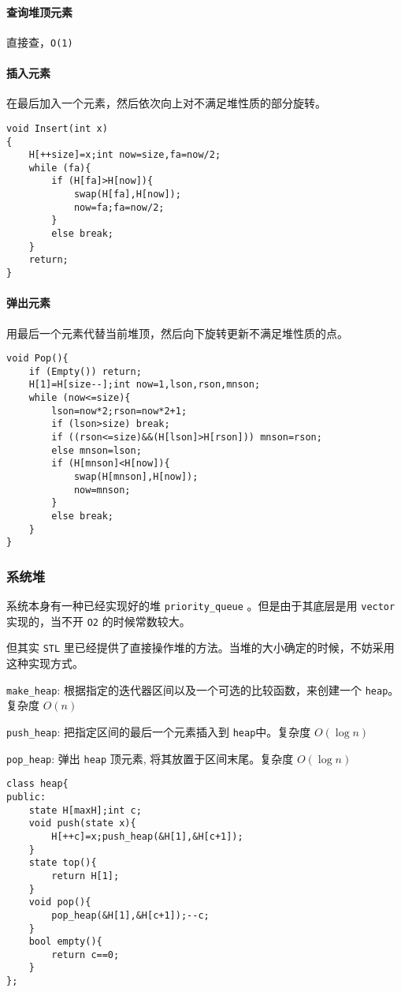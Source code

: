 \documentclass[UTF-8]{ctexart}
\begin{document}
	\paragraph{查询堆顶元素} 直接查，\texttt{O(1)}
	\paragraph{插入元素} 在最后加入一个元素，然后依次向上对不满足堆性质的部分旋转。
\begin{verbatim}
void Insert(int x)
{
    H[++size]=x;int now=size,fa=now/2;
    while (fa){
        if (H[fa]>H[now]){
            swap(H[fa],H[now]);
            now=fa;fa=now/2;
        }
        else break;
    }
    return;
}
\end{verbatim}
	\paragraph{弹出元素} 用最后一个元素代替当前堆顶，然后向下旋转更新不满足堆性质的点。
\begin{verbatim}
void Pop(){
    if (Empty()) return;
    H[1]=H[size--];int now=1,lson,rson,mnson;
    while (now<=size){
        lson=now*2;rson=now*2+1;
        if (lson>size) break;
        if ((rson<=size)&&(H[lson]>H[rson])) mnson=rson;
        else mnson=lson;
        if (H[mnson]<H[now]){
            swap(H[mnson],H[now]);
            now=mnson;
        }
        else break;
    }
}
\end{verbatim}
	\subsubsection{系统堆}
	系统本身有一种已经实现好的堆 \texttt{priority\_queue} 。但是由于其底层是用 \texttt{vector} 实现的，当不开 \texttt{O2} 的时候常数较大。
	
	但其实 \texttt{STL} 里已经提供了直接操作堆的方法。当堆的大小确定的时候，不妨采用这种实现方式。
	
	\texttt{make\_heap}: 根据指定的迭代器区间以及一个可选的比较函数，来创建一个 \texttt{heap}。 复杂度 $O(n)$
	
	\texttt{push\_heap}: 把指定区间的最后一个元素插入到 \texttt{heap}中。复杂度 $O(\log n)$
	
	\texttt{pop\_heap}: 弹出 \texttt{heap} 顶元素, 将其放置于区间末尾。复杂度 $O(\log n)$
	
\begin{verbatim}
class heap{
public:
    state H[maxH];int c;
    void push(state x){
        H[++c]=x;push_heap(&H[1],&H[c+1]);
    }
    state top(){
        return H[1];
    }
    void pop(){
        pop_heap(&H[1],&H[c+1]);--c;
    }
    bool empty(){
        return c==0;
    }
};
\end{verbatim}
\end{document}
